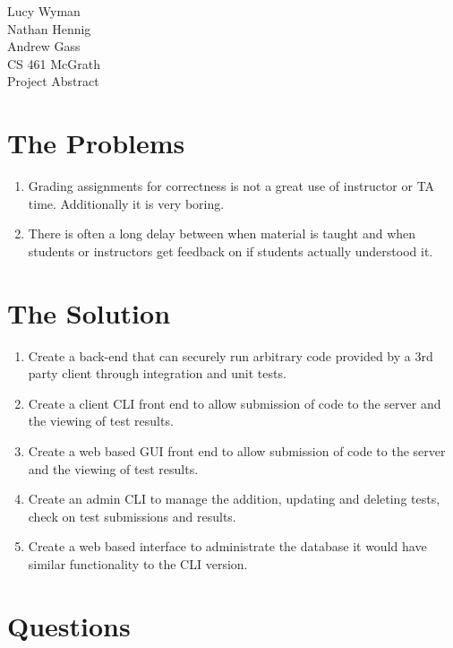 \documentclass[12pt]{article}
\begin{document}
\noindent
Lucy Wyman\\
Nathan Hennig\\
Andrew Gass\\
CS 461 McGrath\\
Project Abstract\\

\section{The Problems}
\begin{enumerate}
    \item Grading assignments for correctness is not a great use of 
        instructor or TA time. Additionally it is very boring. 

    \item There is often a long delay between when material is taught 
        and when students or instructors get feedback on if students 
        actually understood it.
\end{enumerate}

\section{The Solution}
\begin{enumerate}
    \item Create a back-end that can securely run arbitrary code 
        provided by a 3rd party client through integration and unit 
        tests. 

    \item Create a client CLI front end to allow submission of code 
        to the server and the viewing of test results.

    \item Create a web based GUI front end to allow submission of 
        code to the server and the viewing of test results. 

    \item Create an admin CLI to manage the addition, updating and 
        deleting tests, check on test submissions and results.

    \item Create a web based interface to administrate the database 
        it would have similar functionality to the CLI version.
\end{enumerate}
\section{Questions}
\end{document}
